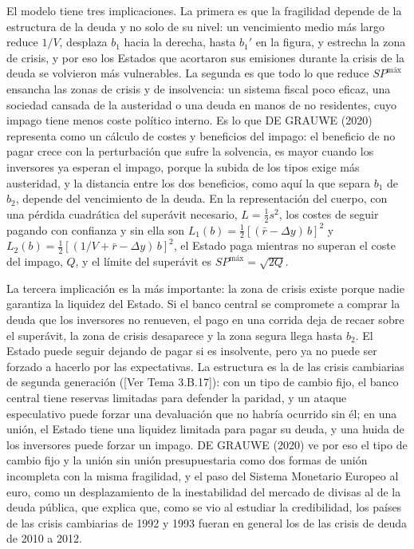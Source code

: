 \documentclass[10pt,a4paper]{article}
\newcommand{\authorfont}[1]{{\fontfamily{EBGaramond-TLF}\selectfont #1}}
\begin{document}
El modelo tiene tres implicaciones. La primera es que la fragilidad depende de la estructura de la deuda y no solo de su nivel: un vencimiento medio más largo reduce $1/V$, desplaza $b_1$ hacia la derecha, hasta $b_1'$ en la figura, y estrecha la zona de crisis, y por eso los Estados que acortaron sus emisiones durante la crisis de la deuda se volvieron más vulnerables. La segunda es que todo lo que reduce $SP^{\text{máx}}$ ensancha las zonas de crisis y de insolvencia: un sistema fiscal poco eficaz, una sociedad cansada de la austeridad o una deuda en manos de no residentes, cuyo impago tiene menos coste político interno. Es lo que DE GRAUWE (2020) representa como un cálculo de costes y beneficios del impago: el beneficio de no pagar crece con la perturbación que sufre la solvencia, es mayor cuando los inversores ya esperan el impago, porque la subida de los tipos exige más austeridad, y la distancia entre los dos beneficios, como aquí la que separa $b_1$ de $b_2$, depende del vencimiento de la deuda. En la representación del cuerpo, con una pérdida cuadrática del superávit necesario, $L=\tfrac12 s^2$, los costes de seguir pagando con confianza y sin ella son $L_1(b)=\tfrac12[(\bar r-\Delta y)\,b]^2$ y $L_2(b)=\tfrac12[(1/V+\bar r-\Delta y)\,b]^2$, el Estado paga mientras no superan el coste del impago, $Q$, y el límite del superávit es $SP^{\text{máx}}=\sqrt{2Q}$.

La tercera implicación es la más importante: la zona de crisis existe porque nadie garantiza la liquidez del Estado. Si el banco central se compromete a comprar la deuda que los inversores no renueven, el pago en una corrida deja de recaer sobre el superávit, la zona de crisis desaparece y la zona segura llega hasta $b_2$. El Estado puede seguir dejando de pagar si es insolvente, pero ya no puede ser forzado a hacerlo por las expectativas. La estructura es la de las crisis cambiarias de segunda generación ([\authorfont{Ver Tema 3.B.17}]): con un tipo de cambio fijo, el banco central tiene reservas limitadas para defender la paridad, y un ataque especulativo puede forzar una devaluación que no habría ocurrido sin él; en una unión, el Estado tiene una liquidez limitada para pagar su deuda, y una huida de los inversores puede forzar un impago. DE GRAUWE (2020) ve por eso el tipo de cambio fijo y la unión sin unión presupuestaria como dos formas de unión incompleta con la misma fragilidad, y el paso del Sistema Monetario Europeo al euro, como un desplazamiento de la inestabilidad del mercado de divisas al de la deuda pública, que explica que, como se vio al estudiar la credibilidad, los países de las crisis cambiarias de 1992 y 1993 fueran en general los de las crisis de deuda de 2010 a 2012.
\end{document}
